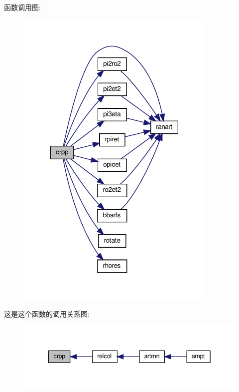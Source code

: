 函数调用图\+:
\nopagebreak
\begin{figure}[H]
\begin{center}
\leavevmode
\includegraphics[width=272pt]{crpp_8f90_aed3e2ac464334a43a5b6604c7ad62885_cgraph}
\end{center}
\end{figure}
这是这个函数的调用关系图\+:
\nopagebreak
\begin{figure}[H]
\begin{center}
\leavevmode
\includegraphics[width=342pt]{crpp_8f90_aed3e2ac464334a43a5b6604c7ad62885_icgraph}
\end{center}
\end{figure}

